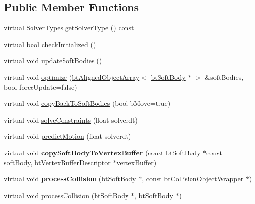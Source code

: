 \subsection*{Public Member Functions}
\begin{DoxyCompactItemize}
\item 
virtual Solver\+Types \hyperlink{classbtDefaultSoftBodySolver_a8c7939edfff8dccf71e3eba0f80e9abe}{get\+Solver\+Type} () const
\item 
virtual bool \hyperlink{classbtDefaultSoftBodySolver_afa91458c5c1bf45d11bd0cc2b5a8fc71}{check\+Initialized} ()
\item 
virtual void \hyperlink{classbtDefaultSoftBodySolver_a28c27dd170396900b6e79379d5781610}{update\+Soft\+Bodies} ()
\item 
virtual void \hyperlink{classbtDefaultSoftBodySolver_a6092bc7e7c762770b9202c231025120b}{optimize} (\hyperlink{classbtAlignedObjectArray}{bt\+Aligned\+Object\+Array}$<$ \hyperlink{classbtSoftBody}{bt\+Soft\+Body} $\ast$ $>$ \&soft\+Bodies, bool force\+Update=false)
\item 
virtual void \hyperlink{classbtDefaultSoftBodySolver_ad56d843b5c510c0cb1e2399e20ab212a}{copy\+Back\+To\+Soft\+Bodies} (bool b\+Move=true)
\item 
virtual void \hyperlink{classbtDefaultSoftBodySolver_a039cf1be486f6493be0983df3f4f1fbf}{solve\+Constraints} (float solverdt)
\item 
virtual void \hyperlink{classbtDefaultSoftBodySolver_a4fc93a921db26b802b6f9fa05d9a7d6b}{predict\+Motion} (float solverdt)
\item 
\mbox{\label{classbtDefaultSoftBodySolver_a651d0c25d0a08e4d7dfe30d820c3e312}} 
virtual void {\bfseries copy\+Soft\+Body\+To\+Vertex\+Buffer} (const \hyperlink{classbtSoftBody}{bt\+Soft\+Body} $\ast$const soft\+Body, \hyperlink{classbtVertexBufferDescriptor}{bt\+Vertex\+Buffer\+Descriptor} $\ast$vertex\+Buffer)
\item 
\mbox{\label{classbtDefaultSoftBodySolver_a4dde8e99903528e7b438f1dc8c7d9887}} 
virtual void {\bfseries process\+Collision} (\hyperlink{classbtSoftBody}{bt\+Soft\+Body} $\ast$, const \hyperlink{structbtCollisionObjectWrapper}{bt\+Collision\+Object\+Wrapper} $\ast$)
\item 
virtual void \hyperlink{classbtDefaultSoftBodySolver_a537aa8ae1601bbafb87ebaf10f5e4e31}{process\+Collision} (\hyperlink{classbtSoftBody}{bt\+Soft\+Body} $\ast$, \hyperlink{classbtSoftBody}{bt\+Soft\+Body} $\ast$)
\end{DoxyCompactItemize}
